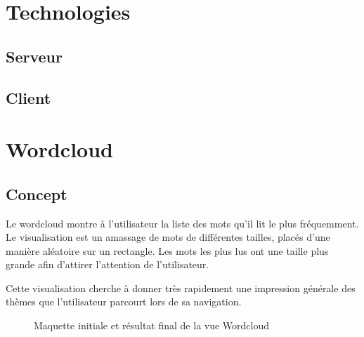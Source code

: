 
\section{Technologies}

	\subsection{Serveur}

	\subsection{Client}

%
%
%
%

\section{Wordcloud}

	\subsection{Concept}

		Le wordcloud montre à l'utilisateur la liste des mots qu'il lit le plus fréquemment. Le visualisation est un amassage de mots de différentes tailles, placés d'une manière aléatoire sur un rectangle. Les mots les plus lus ont une taille plus grande afin d'attirer l'attention de l'utilisateur.

		Cette visualisation cherche à donner très rapidement une impression générale des thèmes que l'utilisateur parcourt lors de sa navigation.

		\begin{figure}[!h]
			\centering
			\caption{Maquette initiale et résultat final de la vue Wordcloud}
			\label{wordcloud_images}
		\end{figure}

